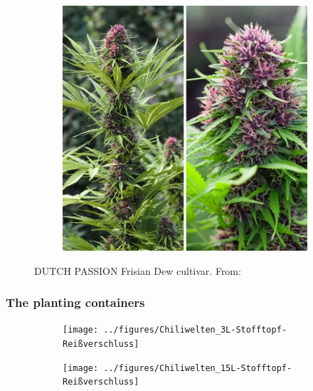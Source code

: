 \documentclass[12pt, aspectratio=1610]{beamer}
\begin{document}
\begin{frame}
\begin{figure}
\begin{subfigure}[t]{.48\textwidth}
                \includegraphics[width=\linewidth]{../figures/DUTCH-PASSION_Frisian-Dew_2}
            \end{subfigure}
            \caption{DUTCH PASSION Frisian Dew cultivar. From: \textcite{noauthor_dutch-passion_frisian-dew_nodate}}
        \end{figure}
    \end{frame}

    \begin{frame}
        \frametitle{The planting containers}
        \begin{figure}
            \begin{subfigure}[t]{.48\textwidth}
                \texttt{[image: ../figures/Chiliwelten\_3L-Stofftopf-Reißverschluss]}
            \end{subfigure}
            \hfill
            \begin{subfigure}[t]{.48\textwidth}
                \texttt{[image: ../figures/Chiliwelten\_15L-Stofftopf-Reißverschluss]}
            \end{subfigure}
        \end{figure}
    \end{frame}
\end{document}
